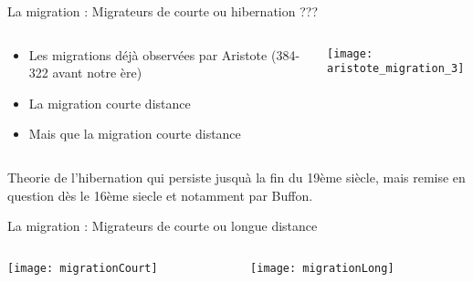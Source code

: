 \documentclass[10pt]{beamer}
\begin{document}
\begin{frame}{La migration :  Migrateurs de courte ou hibernation ???}
   \begin{columns}[c]
    \begin{column}[c]{0.3\textwidth}
      \begin{itemize}
      \item Les migrations déjà observées par Aristote (384-322
        avant notre ère)
      \item La migration courte distance
      \item Mais que la migration courte distance
      \end{itemize}
    \end{column}
    \begin{column}[c]{0.7\textwidth}
      \begin{center}
         \texttt{[image: aristote\_migration\_3]}
      \end{center}
    \end{column}
  \end{columns}
  \begin{center}
    Theorie de l'hibernation qui persiste jusquà la fin du 19ème
    siècle, mais remise en question dès le 16ème siecle et notamment par Buffon. 
  \end{center}
\end{frame}


\begin{frame}{La migration : Migrateurs de courte ou longue distance}
 \begin{columns}[c]
    \begin{column}[c]{0.5\textwidth}
      \begin{center}
       \texttt{[image: migrationCourt]} 
      \end{center}
    \end{column}
    \begin{column}[c]{0.5\textwidth}
      \texttt{[image: migrationLong]} 
        \end{column}
  \end{columns}
\end{frame}
\end{document}
